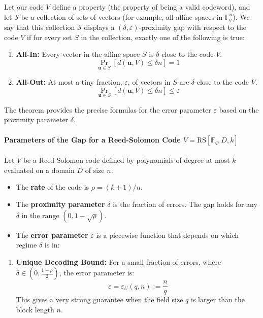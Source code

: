 \documentclass{article}
\begin{document}
\begin{tcolorbox}[breakable, title={Definition: The Proximity Gap for Reed-Solomon Codes}]
Let our code $V$ define a property (the property of being a valid codeword), and let $\mathcal{S}$ be a collection of sets of vectors (for example, all affine spaces in $\mathbb{F}_q^n$). We say that this collection $\mathcal{S}$ displays a $(\delta, \varepsilon)$-proximity gap with respect to the code $V$ if for every set $S$ in the collection, exactly one of the following is true:

\begin{enumerate}
    \item \textbf{All-In:} Every vector in the affine space $S$ is $\delta$-close to the code $V$.
    \[ \Pr_{\mathbf{u} \in S} \left[ d(\mathbf{u}, V) \le \delta n \right] = 1 \]
    \item \textbf{All-Out:} At most a tiny fraction, $\varepsilon$, of vectors in $S$ are $\delta$-close to the code $V$.
    \[ \Pr_{\mathbf{u} \in S} \left[ d(\mathbf{u}, V) \le \delta n \right] \le \varepsilon \]
\end{enumerate}
The theorem provides the precise formulas for the error parameter $\varepsilon$ based on the proximity parameter $\delta$.

\hrulefill

\paragraph{Parameters of the Gap for a Reed-Solomon Code $V = \text{RS}[\mathbb{F}_q, D, k]$}
Let $V$ be a Reed-Solomon code defined by polynomials of degree at most $k$ evaluated on a domain $D$ of size $n$.
\begin{itemize}
    \item The \textbf{rate} of the code is $\rho = (k+1)/n$.
    \item The \textbf{proximity parameter} $\delta$ is the fraction of errors. The gap holds for any $\delta$ in the range $(0, 1-\sqrt{\rho})$.
    \item The \textbf{error parameter} $\varepsilon$ is a piecewise function that depends on which regime $\delta$ is in:
\end{itemize}

\begin{enumerate}
    \item \textbf{Unique Decoding Bound:} For a small fraction of errors, where $\delta \in \left(0, \frac{1-\rho}{2}\right)$, the error parameter is:
    \[ \varepsilon = \varepsilon_U(q, n) := \frac{n}{q} \]
    This gives a very strong guarantee when the field size $q$ is larger than the block length $n$.


\end{enumerate}
\end{tcolorbox}
\end{document}
